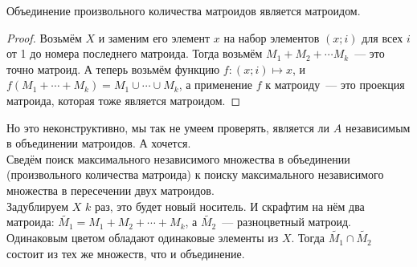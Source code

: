 \documentclass{article}
\begin{document}
    \begin{theorem}
        Объединение произвольного количества матроидов является матроидом.
    \end{theorem}
    \begin{proof}
        Возьмём $X$ и заменим его элемент $x$ на набор элементов $(x;i)$ для всех $i$ от 1 до номера последнего матроида. Тогда возьмём $M_1+M_2+\cdots M_k$~--- это точно матроид. А теперь возьмём функцию $f\colon (x;i)\mapsto x$, и $f(M_1+\cdots+M_k)=M_1\cup\cdots\cup M_k$, а применение $f$ к матроиду~--- это проекция матроида, которая тоже является матроидом.
    \end{proof}
    \begin{remark}
        Но это неконструктивно, мы так не умеем проверять, является ли $A$ независимым в объединении матроидов. А хочется.\\
        Сведём поиск максимального независимого множества в объединении (произвольного количества матроида) к поиску максимального независимого множества в пересечении двух матроидов.\\
        Задублируем $X$ $k$ раз, это будет новый носитель. И скрафтим на нём два матроида: $\widetilde{M_1}=M_1+M_2+\cdots+M_k$, а $\widetilde{M_2}$~--- разноцветный матроид. Одинаковым цветом обладают одинаковые элементы из $X$. Тогда $\widetilde{M_1}\cap\widetilde{M_2}$ состоит из тех же множеств, что и объединение.
    \end{remark}
\end{document}
